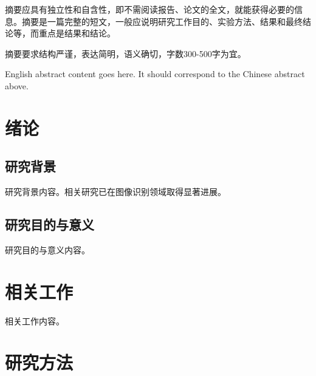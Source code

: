 \documentclass[
    degree=master-professional,
    StudentName=张三,
    StudentNameEng={San Zhang},
    StudentID=2021123456,
    AdvisorName=李四,
    AdvisorNameEng={Si Li},
    AdvisorNameOut=王五,
    AdvisorNameEngOut={Wu Wang},
    Major=电子信息硕士,
    Department=计算机学院,
    DepartmentEng={College of Computer Science},
    ResearchInterest=计算机技术,
    SubmitYear=2024,
    SubmitMonth=6,
    SubmitDay=1,
    DefenseYear=2024,
    DefenseMonth=6,
    DefenseDay=15,
    DefenseDateEng={June 15, 2024},
    CLCNumber=TP391,
    UDCNumber=004.9,
    Title=基于某某方法的某课题研究,
    TitleEng={Research on Some Topic Based on Some Method}
]{cauc_thesis}
\begin{document}
\frontmatter

\makecover

\begin{abstract-zh}
    摘要应具有独立性和自含性，即不需阅读报告、论文的全文，就能获得必要的信息。摘要是一篇完整的短文，一般应说明研究工作目的、实验方法、结果和最终结论等，而重点是结果和结论。

    摘要要求结构严谨，表达简明，语义确切，字数300-500字为宜。

\end{abstract-zh}

\begin{abstract-en}
    English abstract content goes here. It should correspond to the Chinese abstract above.

\end{abstract-en}

\makefrontmatter
\printnomenclature

\mainmatter

\chapter{绪论}


\section{研究背景}

研究背景内容。相关研究已在图像识别领域取得显著进展。

\section{研究目的与意义}

研究目的与意义内容。

\chapter{相关工作}

相关工作内容。

\chapter{研究方法}
\end{document}
